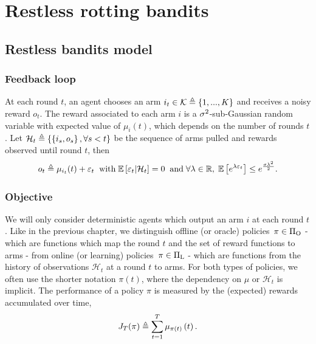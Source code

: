 \section{Restless rotting  bandits}
\label{sec:restless-model}
\subsection{Restless bandits model}
\subsubsection*{Feedback loop}
At each round $t$, an agent chooses an arm $i_t \in \mathcal{K} \triangleq \left\{ 1, ... , K\right\} $ and receives a noisy reward $o_t$. The reward associated to each arm $i$ is a $\sigma^2$-sub-Gaussian random variable with expected value of $\mu_i(t)$, which depends on the number of rounds $t$. Let $\mathcal{H}_t \triangleq \left\{ \left\{ i_s, o_s \right\}, \forall s < t \right\}$ be the sequence of arms pulled and rewards observed until round $t$, then 
%
\begin{equation}
\label{eq:restless-feedback}
o_{t} \triangleq \mu_{i_t}(t) + \varepsilon_t
 \;\; \text{with}\; \mathbb{E}\left[ \varepsilon_t | \mathcal{H}_t \right]= 0 \;\; \text{and} \; \forall \lambda \in \mathbb{R}, \; \mathbb{E}\left[ e^{\lambda\varepsilon_t}\right] \leq e^{\frac{\sigma\lambda^2}{2}}.
\end{equation}
%

\subsubsection*{Objective}
We will only consider deterministic agents which output an arm $i$ at each round $t$. Like in the previous chapter, we distinguish offline (or oracle) policies~$\pi \in \Pi_{\rm O}$ - which are functions which map the round $t$ and the set of reward functions to arms - from online (or learning) policies~$\pi \in \Pi_{\rm L}$ - which are functions from the history of observations $\mathcal{H}_t$ at a round $t$ to arms. For both types of policies, we often use the shorter notation $\pi(t)$, where the dependency on $\mu$ or $\mathcal{H}_t$ is implicit. The performance of a policy $\pi$ is measured by the (expected) rewards accumulated over time, 
%
\begin{equation}
\label{eq:cumul-reward-restless}
J_T(\pi) \triangleq \sum_{t=1}^T \mu_{\pi(t)}\left(t\right).
\end{equation}
%

